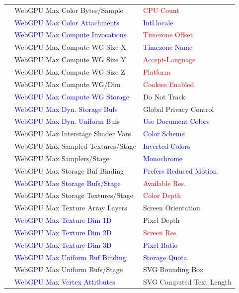 {\begin{longtable}{l | l | l}
 & WebGPU Max Color Bytes/Sample & \textcolor{red}{CPU Count} \\
 & \textcolor{blue}{WebGPU Max Color Attachments} & \textcolor{blue}{Intl.locale} \\
 & \textcolor{blue}{WebGPU Max Compute Invocations} & \textcolor{red}{Timezone Offset} \\
 & WebGPU Max Compute WG Size X & \textcolor{blue}{Timezone Name} \\
 & WebGPU Max Compute WG Size Y & \textcolor{red}{Accept-Language} \\
 & WebGPU Max Compute WG Size Z & \textcolor{red}{Platform} \\
 & WebGPU Max Compute WG/Dim & \textcolor{red}{Cookies Enabled} \\
 & \textcolor{blue}{WebGPU Max Compute WG Storage} & Do Not Track \\
 & \textcolor{blue}{WebGPU Max Dyn. Storage Bufs} & Global Privacy Control \\
 & \textcolor{blue}{WebGPU Max Dyn. Uniform Bufs} & \textcolor{blue}{Use Document Colors} \\
 & WebGPU Max Interstage Shader Vars & \textcolor{blue}{Color Scheme} \\
 & WebGPU Max Sampled Textures/Stage & \textcolor{blue}{Inverted Colors} \\
 & WebGPU Max Samplers/Stage & \textcolor{blue}{Monochrome} \\
 & WebGPU Max Storage Buf Binding & \textcolor{blue}{Prefers Reduced Motion} \\
 & \textcolor{blue}{WebGPU Max Storage Bufs/Stage} & \textcolor{red}{Available Res.} \\
 & WebGPU Max Storage Textures/Stage & \textcolor{red}{Color Depth} \\
 & WebGPU Max Texture Array Layers & Screen Orientation \\
 & \textcolor{blue}{WebGPU Max Texture Dim 1D} & Pixel Depth \\
 & \textcolor{blue}{WebGPU Max Texture Dim 2D} & \textcolor{red}{Screen Res.} \\
 & \textcolor{blue}{WebGPU Max Texture Dim 3D} & \textcolor{blue}{Pixel Ratio} \\
 & \textcolor{blue}{WebGPU Max Uniform Buf Binding} & \textcolor{blue}{Storage Quota} \\
 & WebGPU Max Uniform Bufs/Stage & SVG Bounding Box \\
 & \textcolor{blue}{WebGPU Max Vertex Attributes} & SVG Computed Text Length \\

\end{longtable}}
